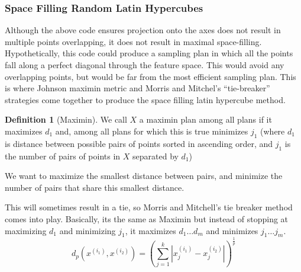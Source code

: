 \documentclass[11pt]{article}
\newcommand{\subsubentry}[1]{\subsubsection{#1}}
\theoremstyle{definition}
\newtheorem{definition}{Definition}
\begin{document}
\subsubentry{Space Filling Random Latin Hypercubes}
Although the above code ensures projection onto the axes does not result in multiple
points overlapping, it does not result in maximal space-filling. Hypothetically, this code could produce
a sampling plan in which all the points fall along a perfect diagonal through the feature space. This would avoid
any overlapping points, but would be far from the most efficient sampling plan.
This is where Johnson maximin metric and Morris and Mitchel's ``tie-breaker'' strategies come
together to produce the space filling latin hypercube method.

\begin{definition}[Maximin]
  We call $X$ a maximin plan among all plans if it maximizes $d_1$ and, among
  all plans for which this is true minimizes $j_1$ (where $d_1$ is distance
  between possible pairs of points sorted in ascending order, and $j_1$ is the
  number of pairs of points in $X$ separated by $d_1$)
\end{definition}

We want to maximize the smallest distance between pairs, and minimize the
number of pairs that share this smallest distance.

This will sometimes result in a tie, so Morris and Mitchell's tie breaker
method comes into play. Basically, its the same as Maximin but instead of
stopping at maximizing $d_1$ and minimizing $j_1$, it maximizes
$d_1 \ldots d_m$ and minimizes $j_1 \ldots j_m$.
\begin{equation}
  d_p (x^{(i_1)}, x^{(i_2)}) = (\sum_{j=1}^{k}|x_j^{(i_1)} - x_j^{(i_2)}|)^{\frac{1}{p}}
  \label{eq:maximin}
\end{equation}
\end{document}
